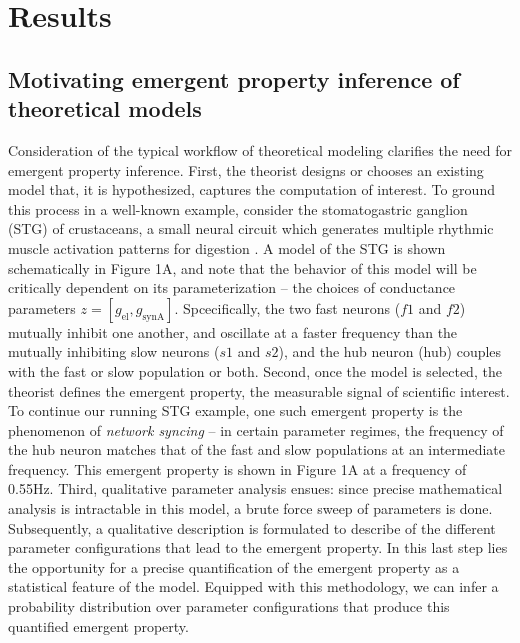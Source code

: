 \documentclass[11pt]{article}
\begin{document}
\section{Results}

\subsection{Motivating emergent property inference of theoretical models} \label{results_motivating}

Consideration of the typical workflow of theoretical modeling clarifies the need for emergent property inference.  
First, the theorist designs or chooses an existing model that, it is hypothesized, captures the computation of interest. 
 To ground this process in a well-known example, consider the stomatogastric ganglion (STG) of crustaceans, a small neural circuit which generates multiple rhythmic muscle activation patterns for digestion \cite{marder2002cellular}.  
 A model of the STG \cite{gutierrez2013multiple} is shown schematically in Figure 1A, and note that the behavior of this model will be critically dependent on its parameterization -- the choices of conductance parameters $z = [g_{\text{el}}, g_{\text{synA}}]$.
Spcecifically, the two fast neurons ($f1$ and $f2$) mutually inhibit one another, and oscillate at a faster frequency than the mutually inhibiting slow neurons ($s1$ and $s2$), and the hub neuron (hub) couples with the fast or slow population or both.  Second, once the model is selected, the theorist defines the emergent property, the measurable signal of scientific interest.  
To continue our running STG example, one such emergent property is the phenomenon of \emph{network syncing} -- in certain parameter regimes, the frequency of the hub neuron matches that of the fast and slow populations at an intermediate frequency.  This emergent property is shown in Figure 1A at a frequency of 0.55Hz.
Third, qualitative parameter analysis ensues: since precise mathematical analysis is intractable in this model, a brute force sweep of parameters is done.  Subsequently, a qualitative description is formulated to describe of the different parameter configurations that lead to the emergent property.  
In this last step lies the opportunity for a precise quantification of the emergent property as a statistical feature of the model.  Equipped with this methodology, we can infer a probability distribution over parameter configurations that produce this quantified emergent property. 
\end{document}
